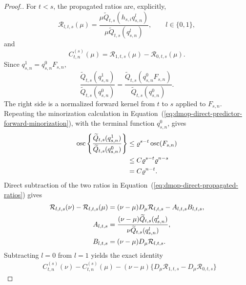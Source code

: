\documentclass[11pt]{article}
\theoremstyle{thmstylethree}%
\begin{document}
\begin{proof}[Proof.]
For $t<s$, the propagated ratios are, explicitly,
\begin{equation}
\mathcal R_{l,t,s}(\mu)
=
\frac{
\mu\widetilde Q_{t,s}(h_{s,i}q_{s,n}^{l})
}{
\mu\widetilde Q_{t,s}(q_{s,n}^{l})
},
\qquad l\in\{0,1\},
\label{eq:dmop-direct-propagated-ratios}
\end{equation}
and
\begin{equation}
C_{t,n}^{(s)}(\mu)
=
\mathcal R_{1,t,s}(\mu)-\mathcal R_{0,t,s}(\mu).
\label{eq:dmop-direct-propagated-ratio-difference}
\end{equation}
Since $q_{s,n}^{1}=q_{s,n}^{0}F_{s,n}$,
\begin{equation}
\frac{
\widetilde Q_{t,s}(q_{s,n}^{1})
}{
\widetilde Q_{t,s}(q_{s,n}^{0})
}
=
\frac{
\widetilde Q_{t,s}(q_{s,n}^{0}F_{s,n})
}{
\widetilde Q_{t,s}(q_{s,n}^{0})
}.
\label{eq:dmop-direct-propagated-future-ratio}
\end{equation}
The right side is a normalized forward kernel from $t$ to $s$ applied
to $F_{s,n}$.  Repeating the minorization calculation in
Equation~(\ref{eq:dmop-direct-predictor-forward-minorization}), with the
terminal function $q_{s,n}^{0}$, gives
\begin{align}
\operatorname{osc}\left\{
\frac{
\widetilde Q_{t,s}(q_{s,n}^{1})
}{
\widetilde Q_{t,s}(q_{s,n}^{0})
}
\right\}
&\leq
\varrho^{s-t}\operatorname{osc}(F_{s,n})                 \notag\\
&\leq
C\varrho^{s-t}\varrho^{n-s}                              \notag\\
&=
C\varrho^{n-t}.
\label{eq:dmop-direct-propagated-future-ratio-contraction}
\end{align}
Direct subtraction of the two ratios in
Equation~(\ref{eq:dmop-direct-propagated-ratios}) gives
\begin{align}
\mathcal R_{l,t,s}(\nu)-\mathcal R_{l,t,s}(\mu)
&=(\nu-\mu)D_\mu\mathcal R_{l,t,s}
-A_{l,t,s}B_{l,t,s},                                      \notag\\
A_{l,t,s}
&=
\frac{
(\nu-\mu)\widetilde Q_{t,s}(q_{s,n}^{l})
}{
\nu\widetilde Q_{t,s}(q_{s,n}^{l})
},                                                        \notag\\
B_{l,t,s}
&=(\nu-\mu)D_\mu\mathcal R_{l,t,s}.
\label{eq:dmop-direct-propagated-exact-ratio-expansion}
\end{align}
Subtracting $l=0$ from $l=1$ yields the exact identity
\begin{align}
&C_{t,n}^{(s)}(\nu)-C_{t,n}^{(s)}(\mu)
-(\nu-\mu)
\{D_\mu\mathcal R_{1,t,s}-D_\mu\mathcal R_{0,t,s}\}

\end{align}
\end{proof}
\end{document}
